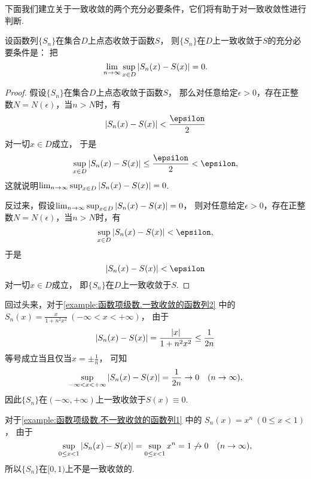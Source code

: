 下面我们建立关于一致收敛的两个充分必要条件，它们将有助于对一致收敛性进行判断.
\begin{theorem}\label{theorem:函数项级数.一致收敛的充分必要条件1}
设函数列\(\{S_n\}\)在集合\(D\)上点态收敛于函数\(S\)，
则\(\{S_n\}\)在\(D\)上一致收敛于\(S\)的充分必要条件是：
把\begin{equation*}
	\lim_{n\to\infty} \sup_{x \in D} \abs{S_n(x) - S(x)} = 0.
\end{equation*}
\begin{proof}
假设\(\{S_n\}\)在集合\(D\)上点态收敛于函数\(S\)，
那么对任意给定\(\epsilon>0\)，存在正整数\(N = N(\epsilon)\)，当\(n>N\)时，有\begin{equation*}
	\abs{S_n(x) - S(x)} < \frac\epsilon2
\end{equation*}对一切\(x \in D\)成立，
于是\begin{equation*}
	\sup_{x \in D} \abs{S_n(x) - S(x)} \leq \frac\epsilon2 < \epsilon,
\end{equation*}
这就说明\(\lim_{n\to\infty} \sup_{x \in D} \abs{S_n(x) - S(x)} = 0\).

反过来，假设\(\lim_{n\to\infty} \sup_{x \in D} \abs{S_n(x) - S(x)} = 0\)，
则对任意给定\(\epsilon>0\)，存在正整数\(N = N(\epsilon)\)，当\(n>N\)时，有\begin{equation*}
	\sup_{x \in D} \abs{S_n(x) - S(x)} < \epsilon,
\end{equation*}
于是\begin{equation*}
	\abs{S_n(x) - S(x)} < \epsilon
\end{equation*}对一切\(x \in D\)成立，
即\(\{S_n\}\)在\(D\)上一致收敛于\(S\).
\end{proof}
\end{theorem}
回过头来，对于\cref{example:函数项级数.一致收敛的函数列2} 中的
\(S_n(x) = \frac{x}{1+n^2x^2}\ (-\infty < x < +\infty)\)，
由于\begin{equation*}
	\abs{S_n(x) - S(x)}
	= \frac{\abs{x}}{1+n^2x^2}
	\leq \frac1{2n}
\end{equation*}等号成立当且仅当\(x=\pm\frac1n\)，
可知\begin{equation*}
	\sup_{-\infty < x < +\infty} \abs{S_n(x) - S(x)}
	= \frac1{2n}
	\to 0
	\quad(n\to\infty),
\end{equation*}
因此\(\{S_n\}\)在\((-\infty,+\infty)\)上一致收敛于\(S(x)\equiv0\).

对于\cref{example:函数项级数.不一致收敛的函数列1} 中的
\(S_n(x) = x^n\ (0 \leq x < 1)\)，
由于\begin{equation*}
	\sup_{0 \leq x < 1} \abs{S_n(x) - S(x)}
	= \sup_{0 \leq x < 1} x^n
	= 1
	\not\to 0
	\quad(n\to\infty),
\end{equation*}
所以\(\{S_n\}\)在\([0,1)\)上不是一致收敛的.

